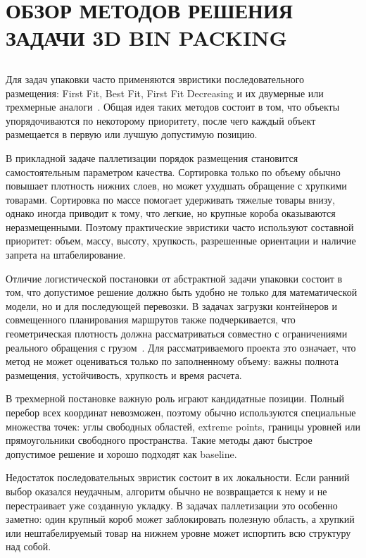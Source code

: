 \clearpage
\section[\MakeUppercase{Обзор методов решения задачи 3D Bin Packing}]{\centering\MakeUppercase{Обзор методов решения задачи 3D Bin Packing}}

\subsection{}

Для задач упаковки часто применяются эвристики последовательного размещения: First Fit, Best Fit, First Fit Decreasing и их двумерные или трехмерные аналоги~\cite{coffman1997,lodi2002}. Общая идея таких методов состоит в том, что объекты упорядочиваются по некоторому приоритету, после чего каждый объект размещается в первую или лучшую допустимую позицию.

В прикладной задаче паллетизации порядок размещения становится самостоятельным параметром качества. Сортировка только по объему обычно повышает плотность нижних слоев, но может ухудшать обращение с хрупкими товарами. Сортировка по массе помогает удерживать тяжелые товары внизу, однако иногда приводит к тому, что легкие, но крупные короба оказываются неразмещенными. Поэтому практические эвристики часто используют составной приоритет: объем, массу, высоту, хрупкость, разрешенные ориентации и наличие запрета на штабелирование.

Отличие логистической постановки от абстрактной задачи упаковки состоит в том, что допустимое решение должно быть удобно не только для математической модели, но и для последующей перевозки. В задачах загрузки контейнеров и совмещенного планирования маршрутов также подчеркивается, что геометрическая плотность должна рассматриваться совместно с ограничениями реального обращения с грузом~\cite{gendreau2006}. Для рассматриваемого проекта это означает, что метод не может оцениваться только по заполненному объему: важны полнота размещения, устойчивость, хрупкость и время расчета.

В трехмерной постановке важную роль играют кандидатные позиции. Полный перебор всех координат невозможен, поэтому обычно используются специальные множества точек: углы свободных областей, extreme points, границы уровней или прямоугольники свободного пространства. Такие методы дают быстрое допустимое решение и хорошо подходят как baseline.

Недостаток последовательных эвристик состоит в их локальности. Если ранний выбор оказался неудачным, алгоритм обычно не возвращается к нему и не перестраивает уже созданную укладку. В задачах паллетизации это особенно заметно: один крупный короб может заблокировать полезную область, а хрупкий или нештабелируемый товар на нижнем уровне может испортить всю структуру над собой.

